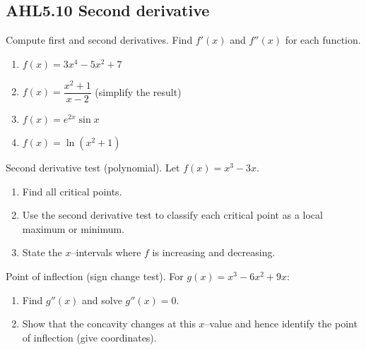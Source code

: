 \documentclass[11pt]{article}
\def\textbf#1{#1}%
\newcommand{\tocsubsection}[1]{\subsection{#1}}
\newcounter{question}
\begin{document}
\tocsubsection{AHL5.10 \; Second derivative}


\begin{question}
\textbf{Compute first and second derivatives.} Find $f'(x)$ and $f''(x)$ for each function.
\begin{enumerate}
  \item $f(x)=3x^{4}-5x^{2}+7$
  \item $f(x)=\dfrac{x^{2}+1}{x-2}$ \quad (simplify the result)
  \item $f(x)=e^{2x}\sin x$
  \item $f(x)=\ln(x^{2}+1)$
\end{enumerate}
\end{question}

\begin{question}
\textbf{Second derivative test (polynomial).}
Let $f(x)=x^{3}-3x$.
\begin{enumerate}
  \item Find all critical points.
  \item Use the second derivative test to classify each critical point as a local maximum or minimum.
  \item State the $x$–intervals where $f$ is increasing and decreasing.
\end{enumerate}

\begin{center}
\end{center}
\end{question}

\begin{question}
\textbf{Point of inflection (sign change test).}
For $g(x)=x^{3}-6x^{2}+9x$:
\begin{enumerate}
  \item Find $g''(x)$ and solve $g''(x)=0$.
  \item Show that the concavity changes at this $x$–value and hence identify the point of inflection (give coordinates).
\end{enumerate}
\end{question}
\end{document}
